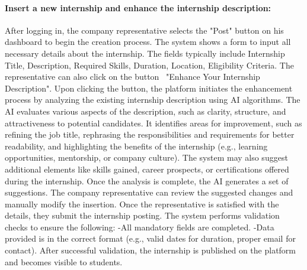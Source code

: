 \paragraph{Insert a new internship and enhance the internship
  description:} After logging in, the company representative selects the
  "Post" button on his dashboard to begin the creation process. The
  system shows a form to input all necessary details about the
  internship. The fields typically include Internship Title,
  Description, Required Skills, Duration, Location, Eligibility
  Criteria. The representative can also click on the button~ "Enhance
  Your Internship Description". Upon clicking the button, the platform
  initiates the enhancement process by analyzing the existing internship
  description using AI algorithms. The AI evaluates various aspects of
  the description, such as clarity, structure, and attractiveness to
  potential candidates. It identifies areas for improvement, such as
  refining the job title, rephrasing the responsibilities and
  requirements for better readability, and highlighting the benefits of
  the internship (e.g., learning opportunities, mentorship, or company
  culture). The system may also suggest additional elements like skills
  gained, career prospects, or certifications offered during the
  internship. Once the analysis is complete, the AI generates a set of
  suggestions. The company representative can review the suggested
  changes and manually modify the insertion.
  Once the representative is satisfied with the details, they submit the internship posting. The system performs validation checks to ensure the following:
  -All mandatory fields are completed.
  -Data provided is in the correct format (e.g., valid dates for duration, proper email for contact).
  After successful validation, the internship is published on the platform and becomes visible to students.

